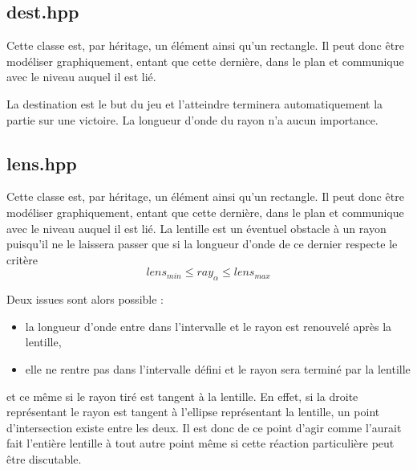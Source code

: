 \documentclass[a4paper,11pt]{report}
\begin{document}
\subsection[Destination]{dest.hpp}
Cette classe est, par héritage, un élément ainsi qu'un rectangle. Il peut donc
être modéliser graphiquement, entant que cette dernière, dans le plan et
communique avec le niveau auquel il est lié. 

La destination est le but du jeu et l'atteindre terminera automatiquement la 
partie sur une victoire. La longueur d'onde du rayon n'a aucun importance.
\subsection[Lentille]{lens.hpp}
\begin{center}
\end{center}
Cette classe est, par héritage, un élément ainsi qu'un rectangle. Il peut donc
être modéliser graphiquement, entant que cette dernière, dans le plan et
communique avec le niveau auquel il est lié. La lentille est un éventuel
obstacle à un rayon puisqu'il ne le laissera passer que si la longueur d'onde de
ce dernier respecte le critère
$$lens_{min} \leq ray_{\alpha} \leq lens_{max}$$

Deux issues sont alors possible :
\begin{itemize}
	\item la longueur d'onde entre dans l'intervalle et le rayon est renouvelé
		après la lentille,
	\item elle ne rentre pas dans l'intervalle défini et le rayon sera terminé par
		la lentille
\end{itemize}
et ce même si le rayon tiré est tangent à la lentille. En effet, si la droite
représentant le rayon est tangent à l'ellipse représentant la lentille,
un point d'intersection existe entre les deux. Il est donc de ce point d'agir
comme l'aurait fait l'entière lentille à tout autre point même si cette
réaction particulière peut être discutable. 
\end{document}
